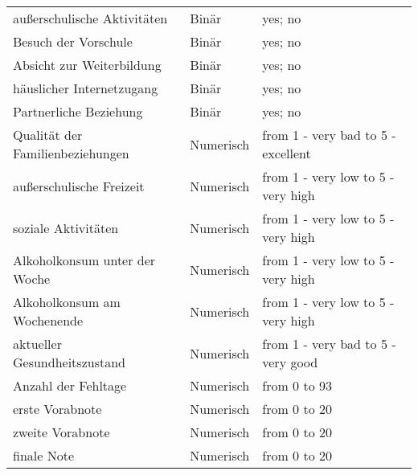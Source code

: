 \begin{table}[!ht]
\begin{tabular}{lll}
        außerschulische Aktivitäten & Binär & yes; no \\ 
        Besuch der Vorschule & Binär & yes; no \\ 
        Absicht zur Weiterbildung & Binär & yes; no \\
        häuslicher Internetzugang & Binär & yes; no \\
        Partnerliche Beziehung & Binär & yes; no \\
        Qualität der Familienbeziehungen & Numerisch & from 1 - very bad to 5 - excellent\\
        außerschulische Freizeit & Numerisch & from 1 - very low to 5 - very high \\
        soziale Aktivitäten & Numerisch & from 1 - very low to 5 - very high \\
        Alkoholkonsum unter der Woche & Numerisch & from 1 - very low to 5 - very high \\
        Alkoholkonsum am Wochenende & Numerisch & from 1 - very low to 5 - very high \\
        aktueller Gesundheitszustand & Numerisch & from 1 - very bad to 5 - very good\\
        Anzahl der Fehltage & Numerisch & from 0 to 93 \\
        erste Vorabnote & Numerisch & from 0 to 20 \\
        zweite Vorabnote & Numerisch & from 0 to 20 \\
        finale Note & Numerisch & from 0 to 20 \\
    \hline
    \end{tabular}
\end{table}

